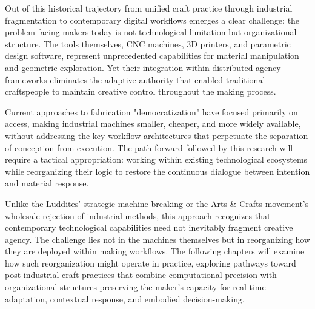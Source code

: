 Out of this historical trajectory from unified craft practice through industrial fragmentation to contemporary digital workflows emerges a clear challenge: the problem facing makers today is not technological limitation but organizational structure. The tools themselves, CNC machines, 3D printers, and parametric design software, represent unprecedented capabilities for material manipulation and geometric exploration. Yet their integration within distributed agency frameworks eliminates the adaptive authority that enabled traditional craftspeople to maintain creative control throughout the making process.

\vspace{0.5cm}

Current approaches to fabrication "democratization" have focused primarily on access, making industrial machines smaller, cheaper, and more widely available, without addressing the key workflow architectures that perpetuate the separation of conception from execution. The path forward followed by this research will require a tactical appropriation: working within existing technological ecosystems while reorganizing their logic to restore the continuous dialogue between intention and material response.

\vspace{0.5cm}

Unlike the Luddites' strategic machine-breaking or the Arts \& Crafts movement's wholesale rejection of industrial methods, this approach recognizes that contemporary technological capabilities need not inevitably fragment creative agency. The challenge lies not in the machines themselves but in reorganizing how they are deployed within making workflows. The following chapters will examine how such reorganization might operate in practice, exploring pathways toward post-industrial craft practices that combine computational precision with organizational structures preserving the maker's capacity for real-time adaptation, contextual response, and embodied decision-making.